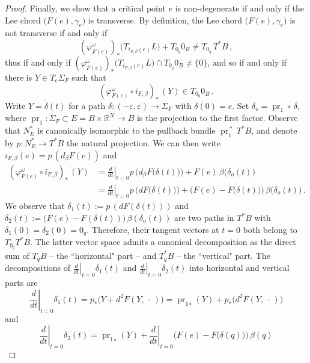 \documentclass{amsart}
\DeclareMathOperator{\pr}{pr}
\theoremstyle{remark}
\begin{document}
\begin{proof}
Finally,
we show that a critical point $e$ is non-degenerate
if and only if the Lee chord $\big( F(e), \gamma_e \big)$ is transverse.
By definition,
the Lee chord $\big( F(e), \gamma_e \big)$ is not transverse
if and only if
\[
(\varphi_{F(e)}^{\omega})_{\ast} \big(T_{i_{F, \beta}(e)} L \big)
+ T_{0_q} 0_B \neq T_{0_q} \, T^{\ast}B \,,
\]
thus if and only if
$(\varphi_{F(e)}^{\omega})_{\ast} \big(T_{i_{F, \beta}(e)} L \big)
\cap T_{0_q} 0_B \neq \{0\}$,
and so
if and only if there is $Y \in T_e \Sigma_F$
such that
\begin{equation}\label{equation: transversality}
(\varphi_{F(e)}^{\omega} \circ i_{F, \beta})_{\ast} \, (Y) \in T_{0_q} 0_B \,.
\end{equation}
Write $Y = \dot{\delta}(t)$
for a path $\delta: (-\varepsilon, \varepsilon) \to \Sigma_F$
with $\delta (0) = e$.
Set $\delta_o = \pr_1 \circ \,\delta$,
where $\pr_1 : \Sigma_F \subset E = B \times \mathbb{R}^N \to B$
is the projection to the first factor.
Observe that $N_E^*$ is canonically isomorphic
to the pullback bundle $\pr_1^{\,\ast}\, T^*B$,
and denote by $p: N_E^* \to T^*B$ the natural projection.
We can then write $i_{F,\beta} (e) = p \, (d_\beta F(e))$ and
\begin{align*}
(\varphi_{F(e)}^{\omega} \circ i_{F, \beta})_{\ast} \, (Y)
&=  \left. \frac{d}{dt} \right \lvert_{t=0}
p \, \Big( d_\beta F \big(\delta(t)\big) \Big) + F(e) \, \beta \big(\delta_o(t)\big) \\
&= \left.\frac{d}{dt} \right \lvert_{t=0}
p \, \Big( dF \big(\delta(t)\big) \Big)
+ \Big(F(e) - F \big(\delta(t)\big)\Big) \, \beta \big(\delta_o(t)\big) \,.
\end{align*}
We observe that $\delta_1 (t) := p \, \left(dF(\delta(t))\right)$
and $\delta_2 (t) := \big( F(e) - F(\delta(t)) \big) \, \beta(\delta_o(t))$
are two paths in $T^*B$ with $\delta_1 (0) = \delta_2(0) = 0_q$.
Therefore,
their tangent vectors at $t = 0$
both belong to $T_{0_q} T^*B$.
The latter vector space admits a canonical decomposition
as the direct sum of $T_q B$ -- the ``horizontal" part -- and $T^*_qB$ -- the ``vertical" part.
The decompositions of $\left. \frac{d}{dt} \right\lvert_{t=0} \delta_1(t)$
and $\left. \frac{d}{dt} \right\lvert_{t=0} \delta_2(t)$
into horizontal and vertical parts are
$$
\left.\frac{d}{dt}\right\lvert_{t=0} \delta_1 (t)
= p_{*} \big( Y + d^2F (Y, \,\cdot\,) \big)
= {\pr_1}_{*} (Y) + p_{\ast} \big( d^2F(Y, \,\cdot\,) \big)
$$
and
$$
\left.\frac{d}{dt}\right\lvert_{t=0} \delta_2 (t)
= {\pr_1}_{*} (Y) + \left.\frac{d}{dt}\right\lvert_{t=0}
\Big( F(e) - F \big(\delta(q)\big) \Big) \, \beta(q)
$$
\end{proof}
\end{document}

